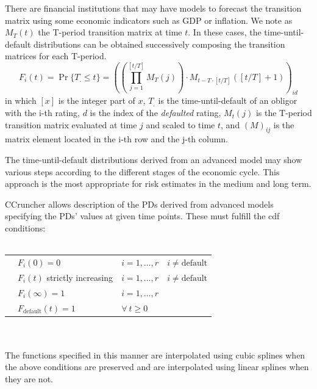 \documentclass[11pt,fleqn]{book} %
\begin{document}
There are financial institutions that may have models to forecast the 
transition matrix using some economic indicators such as GDP or inflation. We 
note as $M_T(t)$ the T-period transition matrix at time $t$. In these cases, 
the time-until-default distributions can be obtained successively composing
the transition matrices for each T-period.
\begin{displaymath}
	F_i(t) = \Pr\{T_. \le t\} = \left(
		\left( \prod_{j=1}^{[t/T]} M_T(j) \right) \cdot 
		M_{t-T\cdot[t/T]}\left([t/T]+1\right) 
		\right)_{id}
\end{displaymath}
in which $[x]$ is the integer part of $x$, $T_.$ is the time-until-default
of an obligor with the i-th rating, $d$ is the index of the \emph{defaulted} 
rating, $M_t(j)$ is the T-period transition matrix evaluated at time $j$ 
and scaled to time $t$, and $(M)_{ij}$ is the matrix element located in the 
i-th row and the j-th column.

The time-until-default distributions derived from an advanced model may show 
various steps according to the different stages of the economic cycle. This 
approach is the most appropriate for risk estimates in the medium and long 
term.

CCruncher allows description of the PDs derived from advanced models specifying 
the PDs' values at given time points. These must fulfill the cdf conditions:
~\\
~\\
\begin{listliketab} 
	\begin{tabular}{Lll}
		\textbullet & $F_i(0) = 0$                 & $i=1,\dots,r \quad i \ne \text{default}$ \\
		\textbullet & $F_i(t)$ strictly increasing & $i=1,\dots,r \quad i \ne \text{default}$ \\
		\textbullet & $F_i(\infty) = 1$            & $i=1,\dots,r$ \\
		\textbullet & $F_{\text{default}}(t) = 1$  & $\forall\ t \ge 0$ \\
	\end{tabular} 
\end{listliketab}
~\\
~\\
The functions specified in this manner are interpolated using cubic splines
when the above conditions are preserved and are interpolated using linear 
splines when they are not.

\end{document}
